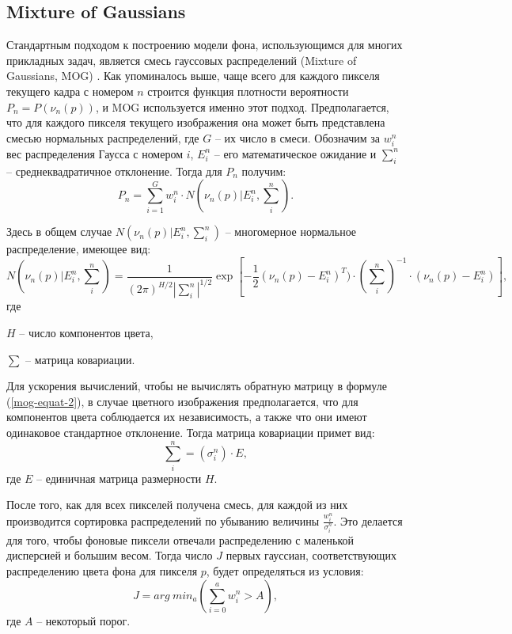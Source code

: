 \subsection{Mixture of Gaussians}

Стандартным подходом к построению модели фона, использующимся для многих
прикладных задач, является смесь гауссовых распределений (Mixture of Gaussians,
MOG) \cite{MOG-1, MOG-2}. Как упоминалось выше, чаще всего для каждого пикселя
текущего кадра с номером $n$ строится функция плотности вероятности 
$P_n=P(\nu_n(p))$, и MOG используется именно этот подход. Предполагается, что 
для каждого пикселя текущего изображения она может быть представлена смесью
нормальных распределений, где $G$ -- их число в смеси.
Обозначим за $w_i^n$ вес распределения Гаусса с номером $i$, $E_i^n$ -- его
математическое ожидание и $\sum^n_i$ -- среднеквадратичное отклонение.
Тогда для $P_n$ получим:
\begin{equation}
	P_n = \sum_{i=1}^G{w_i^n} \cdot N(\nu_n(p)|E^n_i, \sum_i^n).
	\label{mog-equat-1}
\end{equation} 

Здесь в общем случае $N(\nu_n(p)|E^n_i, \sum_i^n)$ -- многомерное 
нормальное распределение, имеющее вид:
\begin{equation}
	N(\nu_n(p)|E^n_i, \sum_i^n) = 
	\frac{1}{(2\pi)^{H/2}|\sum_i^n|^{1/2}}
	\exp[-\frac{1}{2}(\nu_n(p) - E_i^n)^T) \cdot (\sum^n_i)^{-1} 
	\cdot (\nu_n(p) - E^n_i)],
	\label{mog-equat-2}
\end{equation} 
где

$H$ -- число компонентов цвета,

$\sum$ -- матрица ковариации.

Для ускорения вычислений, чтобы не вычислять обратную матрицу в формуле 
(\ref{mog-equat-2}), в случае цветного изображения предполагается, что для
компонентов цвета соблюдается их независимость, а также что они имеют 
одинаковое стандартное отклонение. Тогда матрица ковариации примет вид:
\begin{equation}
	\sum_i^n= (\sigma_i^n) \cdot E,
	\label{mog-equat-3}
\end{equation}
где $E$ -- единичная матрица размерности $H$.

После того, как для всех пикселей получена смесь, для каждой из них производится
сортировка распределений по убыванию величины $\frac{w^n_i}{\sigma^n_i}$.
Это делается для того, чтобы фоновые пиксели отвечали распределению с маленькой 
дисперсией и большим весом. Тогда число $J$ первых гауссиан, соответствующих
распределению цвета фона для пикселя $p$, будет определяться из условия:
\begin{equation}
	J=arg~{min}_a(\sum^a_{i=0}{w^n_i}>A),
	\label{mog-equat-4}
\end{equation} 
где $A$ -- некоторый порог.

